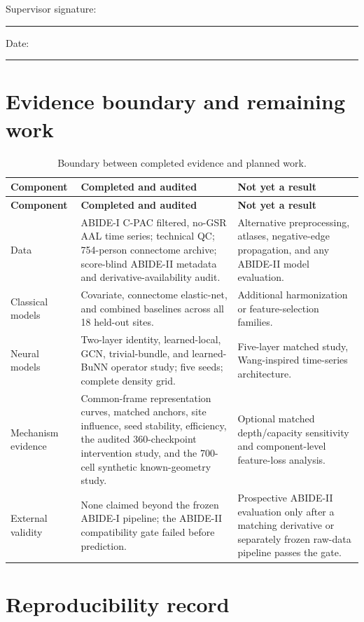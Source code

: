 \documentclass[11pt,a4paper]{article}
\begin{document}
\vspace{1.2cm}
\noindent Supervisor signature: \rule{6.6cm}{0.4pt}\hfill Date: \rule{3.0cm}{0.4pt}

\clearpage
\appendix
\section{Evidence boundary and remaining work}

\begin{longtable}{@{}p{3.2cm}p{5.6cm}p{5.5cm}@{}}
\caption{Boundary between completed evidence and planned work.}\label{tab:status}\\
\toprule
\textbf{Component} & \textbf{Completed and audited} & \textbf{Not yet a result} \\
\midrule
\endfirsthead
\toprule
\textbf{Component} & \textbf{Completed and audited} & \textbf{Not yet a result} \\
\midrule
\endhead
Data & ABIDE-I C-PAC filtered, no-GSR AAL time series; technical QC; 754-person connectome archive; score-blind ABIDE-II metadata and derivative-availability audit. & Alternative preprocessing, atlases, negative-edge propagation, and any ABIDE-II model evaluation. \\
Classical models & Covariate, connectome elastic-net, and combined baselines across all 18 held-out sites. & Additional harmonization or feature-selection families. \\
Neural models & Two-layer identity, learned-local, GCN, trivial-bundle, and learned-BuNN operator study; five seeds; complete density grid. & Five-layer matched study, Wang-inspired time-series architecture. \\
Mechanism evidence & Common-frame representation curves, matched anchors, site influence, seed stability, efficiency, the audited 360-checkpoint intervention study, and the 700-cell synthetic known-geometry study. & Optional matched depth/capacity sensitivity and component-level feature-loss analysis. \\
External validity & None claimed beyond the frozen ABIDE-I pipeline; the ABIDE-II compatibility gate failed before prediction. & Prospective ABIDE-II evaluation only after a matching derivative or separately frozen raw-data pipeline passes the gate. \\
\bottomrule
\end{longtable}

\clearpage
\section{Reproducibility record}
\end{document}
